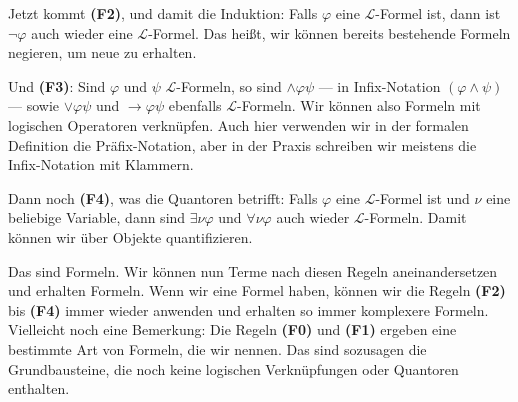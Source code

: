 \begin{spoken-clean}[00:59:59 - 01:02:57]
Jetzt kommt \textbf{(F2)}, und damit die Induktion: Falls $\varphi$ eine $\mathcal{L}$-Formel ist, dann ist $\neg\varphi$ auch wieder eine $\mathcal{L}$-Formel.  Das heißt, wir können bereits bestehende Formeln negieren, um neue zu erhalten.

Und \textbf{(F3)}: Sind $\varphi$ und $\psi$ $\mathcal{L}$-Formeln, so sind $\wedge\varphi\psi$ --- in Infix-Notation $(\varphi \wedge \psi)$ --- sowie $\vee\varphi\psi$ und $\rightarrow\varphi\psi$ ebenfalls $\mathcal{L}$-Formeln.  Wir können also Formeln mit logischen Operatoren verknüpfen. Auch hier verwenden wir in der formalen Definition die Präfix-Notation, aber in der Praxis schreiben wir meistens die Infix-Notation mit Klammern.

Dann noch \textbf{(F4)}, was die Quantoren betrifft: Falls $\varphi$ eine $\mathcal{L}$-Formel ist und $\nu$ eine beliebige Variable, dann sind $\exists\nu\varphi$ und $\forall\nu\varphi$ auch wieder $\mathcal{L}$-Formeln.  Damit können wir über Objekte quantifizieren. 

Das sind Formeln. Wir können nun Terme nach diesen Regeln aneinandersetzen und erhalten Formeln. Wenn wir eine Formel haben, können wir die Regeln \textbf{(F2)} bis \textbf{(F4)} immer wieder anwenden und erhalten so immer komplexere Formeln. Vielleicht noch eine Bemerkung: Die Regeln \textbf{(F0)} und \textbf{(F1)} ergeben eine bestimmte Art von Formeln, die wir  nennen.  Das sind sozusagen die Grundbausteine, die noch keine logischen Verknüpfungen oder Quantoren enthalten.
\end{spoken-clean}

